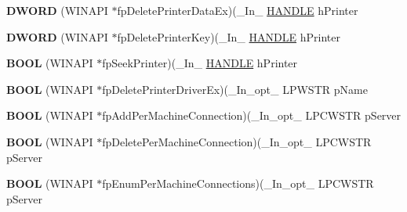 \begin{DoxyCompactItemize}
\item 
\mbox{\label{struct___p_r_i_n_t_p_r_o_v_i_d_o_r_a4b321cfa3810abe32ed0a80cfb914b54}} 
{\bfseries D\+W\+O\+RD} (W\+I\+N\+A\+PI $\ast$fp\+Delete\+Printer\+Data\+Ex)(\+\_\+\+In\+\_\+ \hyperlink{interfacevoid}{H\+A\+N\+D\+LE} h\+Printer
\item 
\mbox{\label{struct___p_r_i_n_t_p_r_o_v_i_d_o_r_a40e5209482a1bbfe899e7f63900570a2}} 
{\bfseries D\+W\+O\+RD} (W\+I\+N\+A\+PI $\ast$fp\+Delete\+Printer\+Key)(\+\_\+\+In\+\_\+ \hyperlink{interfacevoid}{H\+A\+N\+D\+LE} h\+Printer
\item 
\mbox{\label{struct___p_r_i_n_t_p_r_o_v_i_d_o_r_a6a35da3bc7698da53c9424deaf7673eb}} 
{\bfseries B\+O\+OL} (W\+I\+N\+A\+PI $\ast$fp\+Seek\+Printer)(\+\_\+\+In\+\_\+ \hyperlink{interfacevoid}{H\+A\+N\+D\+LE} h\+Printer
\item 
\mbox{\label{struct___p_r_i_n_t_p_r_o_v_i_d_o_r_ab3e8e2f86c17e8f3888ce07b5acfc860}} 
{\bfseries B\+O\+OL} (W\+I\+N\+A\+PI $\ast$fp\+Delete\+Printer\+Driver\+Ex)(\+\_\+\+In\+\_\+opt\+\_\+ L\+P\+W\+S\+TR p\+Name
\item 
\mbox{\label{struct___p_r_i_n_t_p_r_o_v_i_d_o_r_a36861f8357dec103e46a8be5d58b3e49}} 
{\bfseries B\+O\+OL} (W\+I\+N\+A\+PI $\ast$fp\+Add\+Per\+Machine\+Connection)(\+\_\+\+In\+\_\+opt\+\_\+ L\+P\+C\+W\+S\+TR p\+Server
\item 
\mbox{\label{struct___p_r_i_n_t_p_r_o_v_i_d_o_r_a56f255cac3d72463ed10e64dd54f496c}} 
{\bfseries B\+O\+OL} (W\+I\+N\+A\+PI $\ast$fp\+Delete\+Per\+Machine\+Connection)(\+\_\+\+In\+\_\+opt\+\_\+ L\+P\+C\+W\+S\+TR p\+Server
\item 
\mbox{\label{struct___p_r_i_n_t_p_r_o_v_i_d_o_r_ad1afbc6bd611055940564f2a8cf4ec4e}} 
{\bfseries B\+O\+OL} (W\+I\+N\+A\+PI $\ast$fp\+Enum\+Per\+Machine\+Connections)(\+\_\+\+In\+\_\+opt\+\_\+ L\+P\+C\+W\+S\+TR p\+Server
\item 
\mbox{\label{struct___p_r_i_n_t_p_r_o_v_i_d_o_r_a6ec9c02920bd24b622479b36a89dcac2}} 

\end{DoxyCompactItemize}
